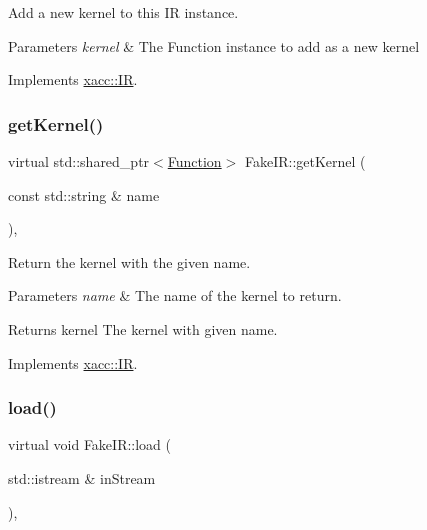 Add a new kernel to this IR instance.


\begin{DoxyParams}{Parameters}
{\em kernel} & The Function instance to add as a new kernel \\
\hline
\end{DoxyParams}


Implements \hyperlink{a02480_abbbf8e6993c518597de32cd05d49d737}{xacc\+::\+IR}.

\mbox{\label{a02492_a351b9a1f9fb748612f5a39007c421efc}} 
\subsubsection{\texorpdfstring{get\+Kernel()}{getKernel()}}
{\footnotesize\ttfamily virtual std\+::shared\+\_\+ptr$<$\hyperlink{a02456}{Function}$>$ Fake\+I\+R\+::get\+Kernel (\begin{DoxyParamCaption}\item[{const std\+::string \&}]{name }\end{DoxyParamCaption})\hspace{0.3cm}{\ttfamily [inline]}, {\ttfamily [virtual]}}

Return the kernel with the given name.


\begin{DoxyParams}{Parameters}
{\em name} & The name of the kernel to return. \\
\hline
\end{DoxyParams}
\begin{DoxyReturn}{Returns}
kernel The kernel with given name. 
\end{DoxyReturn}


Implements \hyperlink{a02480_a6f49b4ba4b3a15142b04873284885f0d}{xacc\+::\+IR}.

\mbox{\label{a02492_ad079b5e83c97bc7fae776679e0f93a1e}} 
\subsubsection{\texorpdfstring{load()}{load()}}
{\footnotesize\ttfamily virtual void Fake\+I\+R\+::load (\begin{DoxyParamCaption}\item[{std\+::istream \&}]{in\+Stream }\end{DoxyParamCaption})\hspace{0.3cm}{\ttfamily [inline]}, {\ttfamily [virtual]}}

